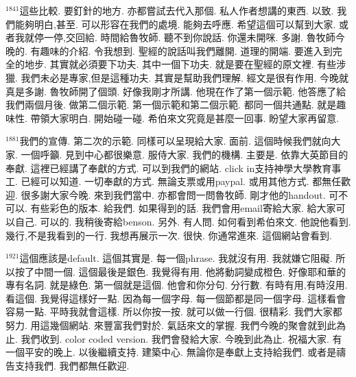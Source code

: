 \documentclass{book}
\begin{document}
$^{1841}$這些比較.
要釘針的地方.
亦都嘗試去代入那個.
私人作者想講的東西.
以致.
我們能夠明白,甚至.
可以形容在我們的處境.
能夠去呼應.
希望這個可以幫到大家.
或者我就停一停,交回給.
時間給魯牧師.
聽不到你說話.
你還未開咪.
多謝.
魯牧師今晚的.
有趣味的介紹.
令我想到.
聖經的說話叫我們離開.
道理的開端.
要進入到完全的地步.
其實就必須要下功夫.
其中一個下功夫.
就是要在聖經的原文裡.
有些涉獵.
我們未必是專家,但是這種功夫.
其實是幫助我們理解.
經文是很有作用.
今晚就真是多謝.
魯牧師開了個頭.
好像我剛才所講.
他現在作了第一個示範.
他答應了給我們兩個月後.
做第二個示範.
第一個示範和第二個示範.
都同一個共通點.
就是趣味性.
帶領大家明白.
開始碰一碰.
希伯來文究竟是甚麼一回事.
盼望大家再留意.

$^{1881}$我們的宣傳.
第二次的示範.
同樣可以呈現給大家.
面前.
這個時候我們就向大家.
一個呼籲.
見到中心都很樂意.
服侍大家.
我們的機構.
主要是.
依靠大英節目的奉獻.
這裡已經講了奉獻的方式.
可以到我們的網站.
click in支持神學大學教育事工.
已經可以知道.
一切奉獻的方式.
無論支票或用paypal.
或用其他方式.
都無任歡迎.
很多謝大家今晚.
來到我們當中.
亦都會問一問魯牧師.
剛才他的handout.
可不可以.
有些彩色的版本.
給我們.
如果得到的話.
我們會用email寄給大家.
給大家可以自己.
可以的.
我稍後寄給benson.
另外.
有人問.
如何看到希伯來文.
他說他看到.
幾行,不是我看到的一行.
我想再展示一次.
很快.
你通常進來.
這個網站會看到.

$^{1921}$這個應該是default.
這個其實是.
每一個phrase.
我就沒有用.
我就嫌它阻礙.
所以按了中間一個.
這個最後是銀色.
我覺得有用.
他將動詞變成橙色.
好像耶和華的專有名詞.
就是綠色.
第一個就是這個.
他會和你分句.
分行數.
有時有用,有時沒用.
看這個.
我覺得這樣好一點.
因為每一個字母.
每一個節都是同一個字母.
這樣看會容易一點.
平時我就會這樣.
所以你按一按.
就可以做一行個.
很精彩.
我們大家都努力.
用這幾個網站.
來豐富我們對於.
氣話來文的掌握.
我們今晚的聚會就到此為止.
我們收到.
color coded version.
我們會發給大家.
今晚到此為止.
祝福大家.
有一個平安的晚上.
以後繼續支持.
建築中心.
無論你是奉獻上支持給我們.
或者是禱告支持我們.
我們都無任歡迎.

\newpage
\end{document}
